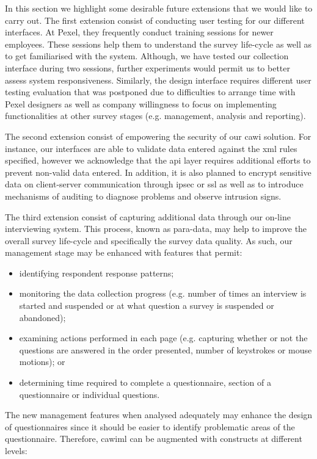	In this section we highlight some desirable future extensions that we would like to carry out. The first extension consist of conducting user testing for our different interfaces. At Pexel, they frequently conduct 
	training sessions for newer employees. These sessions help them to understand the survey life-cycle as well as to get familiarised with the system. Although, we have tested our collection interface during two sessions, further experiments would permit us to better assess system responsiveness. Similarly, the design interface requires different user testing evaluation that was postponed due to difficulties to arrange time with Pexel designers as well as company willingness to focus on implementing functionalities at other survey stages (e.g. management, analysis and reporting). 

	The second extension consist of empowering the security of our \gls{cawi} solution. For instance, our interfaces are able to validate data entered against the \gls{xml} rules specified, however we acknowledge that the \gls{api} layer requires additional efforts to prevent non-valid data entered. In addition, it is also planned to encrypt sensitive data on client-server communication through \gls{ipsec} or \gls{ssl} as well as to introduce mechanisms of auditing to diagnose problems and observe intrusion signs.

	The third extension consist of capturing additional data through our on-line interviewing system. This process, known as para-data, may help to improve the overall survey life-cycle and specifically the survey data quality. As such, our management stage may be enhanced with features that permit:

	\begin{itemize}
		\item identifying respondent response patterns;
		\item monitoring the data collection progress (e.g. number of times an interview is started and suspended or at what question a survey is suspended or abandoned);
		\item examining actions performed in each page (e.g. capturing whether or not the questions are answered in the order presented, number of keystrokes or mouse motions); or
		\item determining time required to complete a questionnaire, section of a questionnaire or individual questions.
	\end{itemize}

	The new management features when analysed adequately may enhance the design of questionnaires since it should be easier to identify problematic areas of the questionnaire. Therefore, \gls{cawiml} can be augmented with constructs at different levels:

